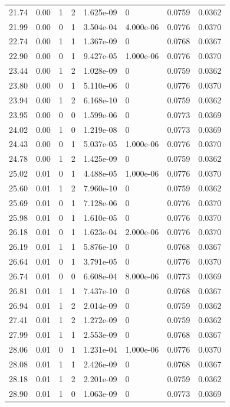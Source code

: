 \documentclass[preview]{standalone}
\begin{document}
{{{\begin{tabular}{L{1.2cm}C{1.2cm} C{0.3cm}C{0.5cm} C{1.4cm}C{1.4cm} C{1.4cm}C{1.4cm}}
  21.74  &  0.00  & 1     &  2 &  1.625e-09  & 0  & 0.0759 &  0.0362   \\ 
  21.99  &  0.00  & 0     &  1 &  3.504e-04  & 4.000e-06  & 0.0776 &  0.0370   \\ 
  22.74  &  0.00  & 1     &  1 &  1.367e-09  & 0  & 0.0768 &  0.0367   \\ 
  22.90  &  0.00  & 0     &  1 &  9.427e-05  & 1.000e-06  & 0.0776 &  0.0370   \\ 
  23.44  &  0.00  & 1     &  2 &  1.028e-09  & 0  & 0.0759 &  0.0362   \\ 
  23.80  &  0.00  & 0     &  1 &  5.110e-06  & 0  & 0.0776 &  0.0370   \\ 
  23.94  &  0.00  & 1     &  2 &  6.168e-10  & 0  & 0.0759 &  0.0362   \\ 
  23.95  &  0.00  & 0     &  0 &  1.599e-06  & 0  & 0.0773 &  0.0369   \\ 
  24.02  &  0.00  & 1     &  0 &  1.219e-08  & 0  & 0.0773 &  0.0369   \\ 
  24.43  &  0.00  & 0     &  1 &  5.037e-05  & 1.000e-06  & 0.0776 &  0.0370   \\ 
  24.78  &  0.00  & 1     &  2 &  1.425e-09  & 0  & 0.0759 &  0.0362   \\ 
  25.02  &  0.01  & 0     &  1 &  4.488e-05  & 1.000e-06  & 0.0776 &  0.0370   \\ 
  25.60  &  0.01  & 1     &  2 &  7.960e-10  & 0  & 0.0759 &  0.0362   \\ 
  25.69  &  0.01  & 0     &  1 &  7.128e-06  & 0  & 0.0776 &  0.0370   \\ 
  25.98  &  0.01  & 0     &  1 &  1.610e-05  & 0  & 0.0776 &  0.0370   \\ 
  26.18  &  0.01  & 0     &  1 &  1.623e-04  & 2.000e-06  & 0.0776 &  0.0370   \\ 
  26.19  &  0.01  & 1     &  1 &  5.876e-10  & 0  & 0.0768 &  0.0367   \\ 
  26.64  &  0.01  & 0     &  1 &  3.791e-05  & 0  & 0.0776 &  0.0370   \\ 
  26.74  &  0.01  & 0     &  0 &  6.608e-04  & 8.000e-06  & 0.0773 &  0.0369   \\ 
  26.81  &  0.01  & 1     &  1 &  7.437e-10  & 0  & 0.0768 &  0.0367   \\ 
  26.94  &  0.01  & 1     &  2 &  2.014e-09  & 0  & 0.0759 &  0.0362   \\ 
  27.41  &  0.01  & 1     &  2 &  1.272e-09  & 0  & 0.0759 &  0.0362   \\ 
  27.99  &  0.01  & 1     &  1 &  2.553e-09  & 0  & 0.0768 &  0.0367   \\ 
  28.06  &  0.01  & 0     &  1 &  1.231e-04  & 1.000e-06  & 0.0776 &  0.0370   \\ 
  28.08  &  0.01  & 1     &  1 &  2.426e-09  & 0  & 0.0768 &  0.0367   \\ 
  28.18  &  0.01  & 1     &  2 &  2.201e-09  & 0  & 0.0759 &  0.0362   \\ 
  28.90  &  0.01  & 1     &  0 &  1.063e-09  & 0  & 0.0773 &  0.0369   \\ 
\hline 
\end{tabular} 

}}}
\end{document}
